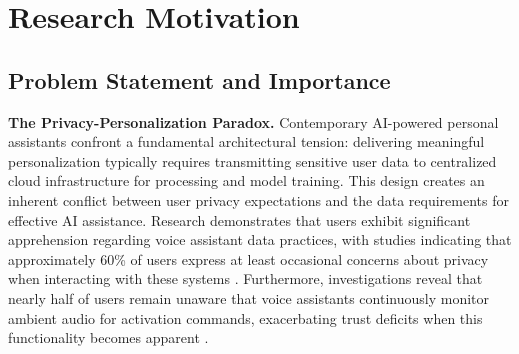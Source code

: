\documentclass[11pt]{article}
\begin{document}
\vspace*{-8pt}
\section{Research Motivation}
\label{sec:motivation}

\vspace*{-8pt}
\subsection{Problem Statement and Importance}
\vspace*{-8pt}
\textbf{The Privacy-Personalization Paradox.} Contemporary AI-powered personal assistants confront a fundamental architectural tension: delivering meaningful personalization typically requires transmitting sensitive user data to centralized cloud infrastructure for processing and model training. This design creates an inherent conflict between user privacy expectations and the data requirements for effective AI assistance. Research demonstrates that users exhibit significant apprehension regarding voice assistant data practices, with studies indicating that approximately 60\% of users express at least occasional concerns about privacy when interacting with these systems \cite{li2023security}. Furthermore, investigations reveal that nearly half of users remain unaware that voice assistants continuously monitor ambient audio for activation commands, exacerbating trust deficits when this functionality becomes apparent \cite{edu2021security}.
\end{document}
